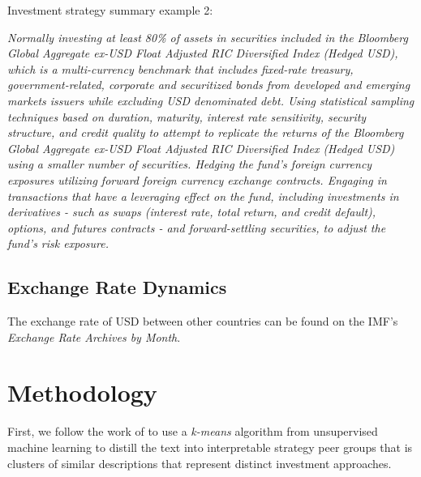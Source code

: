 \documentclass[12pt]{article} %
\begin{document}
	Investment strategy summary example 2:	
	\begin{addmargin}[2cm]{2cm}
	\textit{Normally investing at least 80\% of assets in securities included in the Bloomberg Global Aggregate ex-USD Float Adjusted RIC Diversified Index (Hedged USD), which is a multi-currency benchmark that includes fixed-rate treasury, government-related, corporate and securitized bonds from developed and emerging markets issuers while excluding USD denominated debt. Using statistical sampling techniques based on duration, maturity, interest rate sensitivity, security structure, and credit quality to attempt to replicate the returns of the Bloomberg Global Aggregate ex-USD Float Adjusted RIC Diversified Index (Hedged USD) using a smaller number of securities. Hedging the fund's foreign currency exposures utilizing forward foreign currency exchange contracts. Engaging in transactions that have a leveraging effect on the fund, including investments in derivatives - such as swaps (interest rate, total return, and credit default), options, and futures contracts - and forward-settling securities, to adjust the fund's risk exposure.}
	\end{addmargin}
	
	\subsection{Exchange Rate Dynamics}
	The exchange rate of USD between other countries can be found on the IMF's \textit{Exchange Rate Archives by Month}.
	
\section{Methodology}
	First, we follow the work of \cite{AbisLines2022} to use a \textit{k-means} algorithm from unsupervised machine learning to distill the text into interpretable strategy peer groups that is clusters of similar descriptions that represent distinct investment approaches.\par
	
\end{document}
